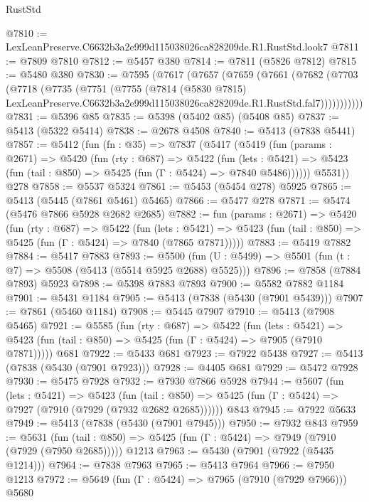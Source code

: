 \begin{lexlean}{RustStd}
\begin{coremodule}
@7810 := LexLeanPreserve.C6632b3a2e999d115038026ca828209de.R1.RustStd.look7
@7811 := @7809 @7810
@7812 := @5457 @380
@7814 := @7811 (@5826 @7812)
@7815 := @5480 @380
@7830 := @7595
    (@7617
      (@7657
        (@7659
          (@7661
            (@7682
              (@7703
                (@7718
                  (@7735
                    (@7751
                      (@7755
                        (@7814
                          (@5830 @7815)
                          LexLeanPreserve.C6632b3a2e999d115038026ca828209de.R1.RustStd.fal7)))))))))))
@7831 := @5396 @85
@7835 := @5398 (@5402 @85) (@5408 @85)
@7837 := @5413 (@5322 @5414)
@7838 := @2678 @4508
@7840 := @5413 (@7838 @5441)
@7857 := @5412
    (fun (fn : @35) =>
    @7837
      (@5417
        (@5419
          (fun (params : @2671) =>
          @5420
            (fun (rty : @687) =>
            @5422
              (fun (lets : @5421) =>
              @5423 (fun (tail : @850) => @5425 (fun (Γ : @5424) => @7840 @5486))))))
        @5531))
    @278
@7858 := @5537 @5324
@7861 := @5453 (@5454 @278) @5925
@7865 := @5413 (@5445 (@7861 @5461) @5465)
@7866 := @5477 @278
@7871 := @5474 (@5476 @7866 @5928 @2682 @2685)
@7882 := fun (params : @2671) =>
  @5420
    (fun (rty : @687) =>
    @5422
      (fun (lets : @5421) =>
      @5423 (fun (tail : @850) => @5425 (fun (Γ : @5424) => @7840 (@7865 @7871)))))
@7883 := @5419 @7882
@7884 := @5417 @7883
@7893 := @5500 (fun (U : @5499) => @5501 (fun (t : @7) => @5508 (@5413 (@5514 @5925 @2688) @5525)))
@7896 := @7858 (@7884 @7893) @5923
@7898 := @5398 @7883 @7893
@7900 := @5582 @7882 @1184
@7901 := @5431 @1184
@7905 := @5413 (@7838 (@5430 (@7901 @5439)))
@7907 := @7861 (@5460 @1184)
@7908 := @5445 @7907
@7910 := @5413 (@7908 @5465)
@7921 := @5585
    (fun (rty : @687) =>
    @5422
      (fun (lets : @5421) =>
      @5423 (fun (tail : @850) => @5425 (fun (Γ : @5424) => @7905 (@7910 @7871)))))
    @681
@7922 := @5433 @681
@7923 := @7922 @5438
@7927 := @5413 (@7838 (@5430 (@7901 @7923)))
@7928 := @4405 @681
@7929 := @5472 @7928
@7930 := @5475 @7928
@7932 := @7930 @7866 @5928
@7944 := @5607
    (fun (lets : @5421) =>
    @5423
      (fun (tail : @850) => @5425 (fun (Γ : @5424) => @7927 (@7910 (@7929 (@7932 @2682 @2685))))))
    @843
@7945 := @7922 @5633
@7949 := @5413 (@7838 (@5430 (@7901 @7945)))
@7950 := @7932 @843
@7959 := @5631
    (fun (tail : @850) => @5425 (fun (Γ : @5424) => @7949 (@7910 (@7929 (@7950 @2685)))))
    @1213
@7963 := @5430 (@7901 (@7922 (@5435 @1214)))
@7964 := @7838 @7963
@7965 := @5413 @7964
@7966 := @7950 @1213
@7972 := @5649 (fun (Γ : @5424) => @7965 (@7910 (@7929 @7966))) @5680

\end{coremodule}
\end{lexlean}
